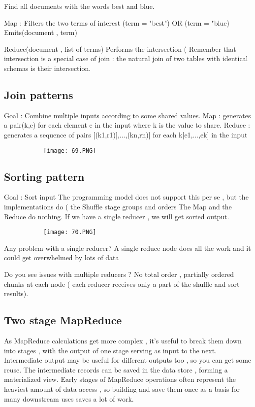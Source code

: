 \documentclass{article}
\begin{document}
Find all documents with the words best and blue.

Map : Filters the two terms of interest (term = "best") OR (term = "blue) 
Emits(document , term)

Reduce(document , list of terms)
Performs the intersection ( Remember that intersection is a special case of join : the natural join of two tables with identical schemas is their intersection.

\subsection{Join patterns}

Goal : Combine multiple inputs according to some shared values.
Map : generates a pair(k,e) for each element e in the input where k is the value to share.
Reduce : generates a sequence of pairs [(k1,r1)],...,(kn,rn)] for each k[e1,...,ek] in the input

\begin{figure}[ht!]
  \centering
  \begin{subfigure}[b]{0.5\linewidth}
    \texttt{[image: 69.PNG]}
  \end{subfigure}
\end{figure}


\subsection{Sorting pattern}

Goal : Sort input
The programming model does not support this per se , but the implementations do ( the Shuffle stage groups and orders
The Map and the Reduce do nothing.
If we have a single reducer , we will get sorted output.


\begin{figure}[ht!]
  \centering
  \begin{subfigure}[b]{0.5\linewidth}
    \texttt{[image: 70.PNG]}
  \end{subfigure}
\end{figure}

Any problem with a single reducer? A single reduce node does all the work and it could get overwhelmed by lots of data

Do you see issues with multiple reducers ? No total order , partially ordered chunks at each node ( each reducer receives only a part of the shuffle and sort results).

\subsection{Two stage MapReduce}
As MapReduce calculations get more complex , it's useful to break them down into stages , with the output of one stage serving as input to the next.
Intermediate output may be useful for different outputs too ,  so you can get some reuse.
The intermediate records can be saved in the data store , forming a materialized view.
Early stages of MapReduce operations often represent the heaviest amount of data access , so building and save them once as a basis for many downstream uses saves a lot of work.
\end{document}
